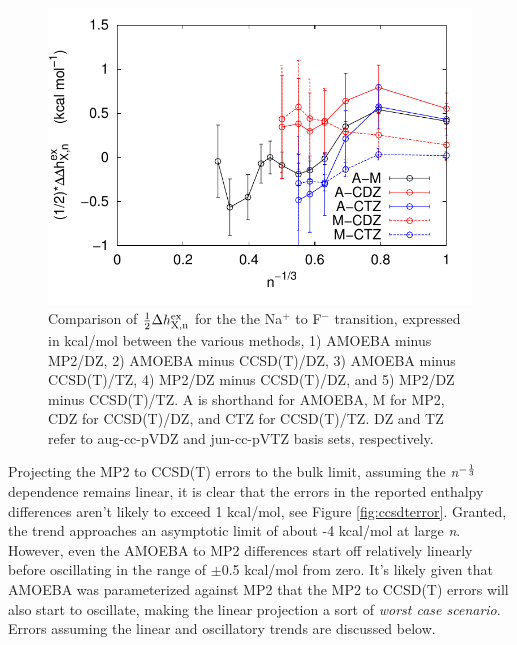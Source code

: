\begin{cpa}
\begin{figure}
 \begin{center}
  \includegraphics[width=0.98\linewidth]{images/cpa/deltaH_diffs_all-eps-converted-to.pdf}
 \end{center}
\caption[Differences in $\frac{1}{2}h\sursous{ex}{X,n}$ between methods]{Comparison of $\frac{1}{2}\Delta h^{\mathrm{ex}}_{\mathrm{X,n}}$ for the the Na$^+$ to F$^-$ transition, expressed
in kcal/mol between the various methods, 1) AMOEBA minus MP2/DZ, 2) AMOEBA minus CCSD(T)/DZ, 3) AMOEBA minus CCSD(T)/TZ, 4) MP2/DZ minus CCSD(T)/DZ, and 5) MP2/DZ minus
CCSD(T)/TZ. A is shorthand for AMOEBA, M for MP2, CDZ for CCSD(T)/DZ, and CTZ for CCSD(T)/TZ. DZ and TZ refer to aug-cc-pVDZ and jun-cc-pVTZ basis sets, respectively.}
\label{fig:dHfreediffs}
\end{figure}

  Projecting the MP2 to CCSD(T) errors to the bulk limit, assuming the \emph{n}$^{\mathrm{-\frac{1}{3}}}$ dependence remains linear, it is clear that the errors in the reported
  enthalpy differences aren't likely to exceed 1 kcal/mol, see Figure \ref{fig:ccsdterror}. Granted, the trend approaches an asymptotic limit of about -4 kcal/mol at large 
  \emph{n}. However, even the AMOEBA to MP2 differences start off relatively linearly before oscillating in the range of $\pm$0.5 kcal/mol from zero. It's likely given that
  AMOEBA was parameterized against MP2 that the MP2 to CCSD(T) errors will also start to oscillate, making the linear projection a sort of \emph{worst case scenario}. Errors
  assuming the linear and oscillatory trends are discussed below.


\end{cpa}
